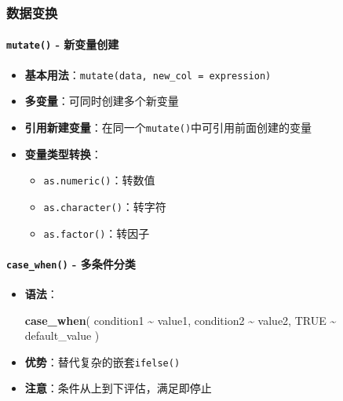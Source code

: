 \documentclass[
  twoside]{book}
\newenvironment{Shaded}{\begin{snugshade}}{\end{snugshade}}
\newcommand{\ConstantTok}[1]{\textcolor[rgb]{0.56,0.35,0.01}{#1}}
\newcommand{\FunctionTok}[1]{\textcolor[rgb]{0.13,0.29,0.53}{\textbf{#1}}}
\newcommand{\NormalTok}[1]{#1}
\newcommand{\SpecialCharTok}[1]{\textcolor[rgb]{0.81,0.36,0.00}{\textbf{#1}}}
\providecommand{\tightlist}{%
  \setlength{\itemsep}{0pt}\setlength{\parskip}{0pt}}
\begin{document}
\hypertarget{ux6570ux636eux53d8ux6362}{%
\subsubsection{数据变换}\label{ux6570ux636eux53d8ux6362}}

\hypertarget{mutate---ux65b0ux53d8ux91cfux521bux5efa}{%
\paragraph{\texorpdfstring{\texttt{mutate()} - 新变量创建}{mutate() - 新变量创建}}\label{mutate---ux65b0ux53d8ux91cfux521bux5efa}}

\begin{itemize}
\tightlist
\item
  \textbf{基本用法}：\texttt{mutate(data,\ new\_col\ =\ expression)}
\item
  \textbf{多变量}：可同时创建多个新变量
\item
  \textbf{引用新建变量}：在同一个\texttt{mutate()}中可引用前面创建的变量
\item
  \textbf{变量类型转换}：

  \begin{itemize}
  \tightlist
  \item
    \texttt{as.numeric()}：转数值
  \item
    \texttt{as.character()}：转字符
  \item
    \texttt{as.factor()}：转因子
  \end{itemize}
\end{itemize}

\hypertarget{case_when---ux591aux6761ux4ef6ux5206ux7c7b}{%
\paragraph{\texorpdfstring{\texttt{case\_when()} - 多条件分类}{case\_when() - 多条件分类}}\label{case_when---ux591aux6761ux4ef6ux5206ux7c7b}}

\begin{itemize}
\item
  \textbf{语法}：

\begin{Shaded}
\begin{Highlighting}[]
\FunctionTok{case\_when}\NormalTok{(}
\NormalTok{  condition1 }\SpecialCharTok{\textasciitilde{}}\NormalTok{ value1,}
\NormalTok{  condition2 }\SpecialCharTok{\textasciitilde{}}\NormalTok{ value2,}
  \ConstantTok{TRUE} \SpecialCharTok{\textasciitilde{}}\NormalTok{ default\_value}
\NormalTok{)}
\end{Highlighting}
\end{Shaded}
\item
  \textbf{优势}：替代复杂的嵌套\texttt{ifelse()}
\item
  \textbf{注意}：条件从上到下评估，满足即停止
\end{itemize}
\end{document}
